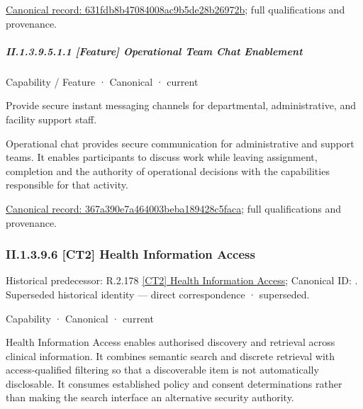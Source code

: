 {\footnotesize \href{../../../../continuum/strategy/capability/631fdb8b47084008ac9b5de28b26972b.md}{Canonical record: 631fdb8b47084008ac9b5de28b26972b}; full qualifications and provenance.}\par
\subparagraph*{II.1.3.9.5.1.1 [Feature] Operational Team Chat Enablement}
\label{navigation:II.1.3.9.5.1.1}

\label{element:367a390e7a464003beba189428c5faca}
{\small Capability / Feature · Canonical · current}\par

Provide secure instant messaging channels for departmental, administrative, and facility support staff.



Operational chat provides secure communication for administrative and support teams. It enables participants to discuss work while leaving assignment, completion and the authority of operational decisions with the capabilities responsible for that activity.


{\footnotesize \href{../../../../continuum/strategy/capability/feature/367a390e7a464003beba189428c5faca.md}{Canonical record: 367a390e7a464003beba189428c5faca}; full qualifications and provenance.}\par
\subsubsection*{II.1.3.9.6 [CT2] Health Information Access}
\label{navigation:II.1.3.9.6}

{\small Historical predecessor: R.2.178 \hyperref[element:5019ae9f2cdc45a1b2de97bc0f5a313d]{[CT2] Health Information Access}; Canonical ID: \texttt{}. Superseded historical identity — direct correspondence · superseded.}\par
\label{element:cc253aea3c5f489da0502df74dde1669}
{\small Capability · Canonical · current}\par

Health Information Access enables authorised discovery and retrieval across clinical information. It combines semantic search and discrete retrieval with access-qualified filtering so that a discoverable item is not automatically disclosable. It consumes established policy and consent determinations rather than making the search interface an alternative security authority.



